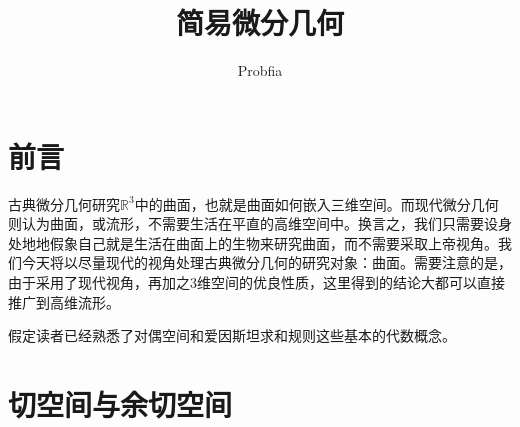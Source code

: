 \documentclass[a4paper,11pt]{ctexart}
\title{简易微分几何}
\author{Probfia}
\date{}
\newcommand{\reals}{\mathbb{R}}
\begin{document}
\maketitle
\section{前言}
古典微分几何研究$\reals^3$中的曲面，也就是曲面如何嵌入三维空间。而现代微分几何则认为曲面，或流形，不需要生活在平直的高维空间中。换言之，我们只需要设身处地地假象自己就是生活在曲面上的生物来研究曲面，而不需要采取上帝视角。我们今天将以尽量现代的视角处理古典微分几何的研究对象：曲面。需要注意的是，由于采用了现代视角，再加之3维空间的优良性质，这里得到的结论大都可以直接推广到高维流形。
\par
假定读者已经熟悉了对偶空间和爱因斯坦求和规则这些基本的代数概念。

\section{切空间与余切空间}
\end{document}
